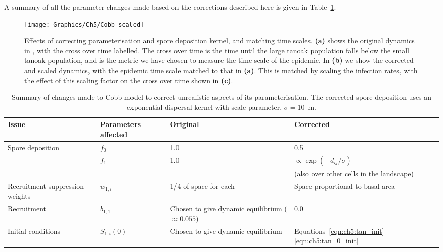 A summary of all the parameter changes made based on the corrections described here is given in Table~\ref{tab:ch5:param_changes}.

\begin{figure}[h]
    \begin{center}
        \texttt{[image: Graphics/Ch5/Cobb\_scaled]}
        \caption[Effect of model reparameterisation and infection rate scaling]{Effects of correcting parameterisation and spore deposition kernel, and matching time scales. \textbf{(a)} shows the original dynamics in \citet{cobb_ecosystem_2012}, with the cross over time labelled. The cross over time is the time until the large tanoak population falls below the small tanoak population, and is the metric we have chosen to measure the time scale of the epidemic. In \textbf{(b)} we show the corrected and scaled dynamics, with the epidemic time scale matched to that in \textbf{(a)}. This is matched by scaling the infection rates, with the effect of this scaling factor on the cross over time shown in \textbf{(c)}.\label{fig:ch5:inf_scaling}}
    \end{center}
\end{figure}

\begin{table}[h]
    \centering
    \caption[Summary of corrections to Cobb model]{Summary of changes made to Cobb model to correct unrealistic aspects of its parameterisation. The corrected spore deposition uses an exponential dispersal kernel with scale parameter, $\sigma=$\SI{10}{\meter}.\label{tab:ch5:param_changes}}
    \begin{tabular}{@{}p{3.5cm}p{2cm}p{4cm}p{3cm}@{}}
        \toprule
        \textbf{Issue} & \textbf{Parameters affected} & \textbf{Original} & \textbf{Corrected} \\
        \midrule
        Spore deposition & $f_0$ & 1.0 & 0.5 \\
        & $f_1$ & 1.0 & $\propto \exp{\left(-d_{ij}/\sigma\right)}$ \\
        &&&{\small{}(also over other cells in the landscape)}\\
        \midrule
        Recruitment suppression weights & $w_{1,i}$ & 1/4 of space for each & Space proportional to basal area \\
        \midrule
        Recruitment & $b_{1,1}$ & Chosen to give dynamic equilibrium ($\approx{}0.055$) & 0.0 \\
        \midrule
        Initial conditions & $S_{1,i}(0)$ & Chosen to give dynamic equilibrium & Equations~\ref{eqn:ch5:tan_init}--\ref{eqn:ch5:tan_0_init} \\
        \bottomrule
    \end{tabular}
\end{table}

